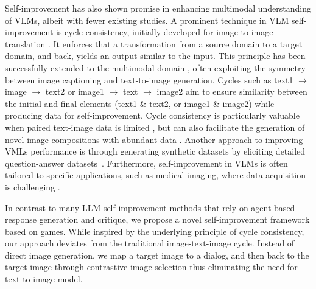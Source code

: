 Self-improvement has also shown promise in enhancing multimodal understanding of VLMs, albeit with fewer existing studies.
A prominent technique in VLM self-improvement is cycle consistency, initially developed for image-to-image translation \citep{zhu2017cyclegan}.
It enforces that a transformation from a source domain to a target domain, and back, yields an output similar to the input.
This principle has been successfully extended to the multimodal domain \citep{li2023leveraging, li2023dalle, sharifzadeh2024synth}, often exploiting the symmetry between image captioning and text-to-image generation.
Cycles such as text1 $\rightarrow$ image  $\rightarrow$ text2 or image1  $\rightarrow$ text  $\rightarrow$ image2 aim to ensure similarity between the initial and final elements (text1 \& text2, or image1 \& image2) while producing data for self-improvement. 
Cycle consistency is particularly valuable when paired text-image data is limited \citep{li2023leveraging}, but can also facilitate the generation of novel image compositions with abundant data \citep{sharifzadeh2024synth}. 
Another approach to improving VMLs performance is through generating synthetic datasets by eliciting detailed question-answer datasets~\citep{luu2024questioning}.
Furthermore, self-improvement in VLMs is often tailored to specific applications, such as medical imaging, where data acquisition is challenging \citep{wang2024self}.

In contrast to many LLM self-improvement methods that rely on agent-based response generation and critique, we propose a novel self-improvement framework based on games. 
While inspired by the underlying principle of cycle consistency, our approach deviates from the traditional image-text-image cycle.
Instead of direct image generation, we map a target image to a dialog, and then back to the target image through contrastive image selection thus eliminating the need for text-to-image model.